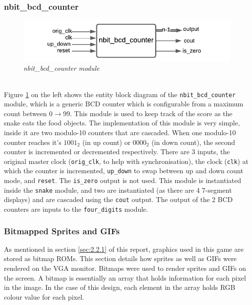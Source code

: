 \documentclass[aps, secnumarabic, balancelastpage, asmath, amssymb, nofootinbib, floatfix,]{revtex4-2}
\begin{document}
{\vspace{-1em}
\subsubsection{\fontsize{10pt}{12pt}\selectfont \bf nbit\_bcd\_counter \label{sec:2.2.8}}

\vspace{-1em}
\begin{figure}
  \centering
  \includegraphics[scale = 0.8]{bcd.pdf}
  \caption{\em nbit\_bcd\_counter module}
  \label{fig:16}
\end{figure}
~\\
Figure \ref{fig:16} on the left shows the entity block diagram of the \verb|nbit_bcd_counter| module, which is a generic BCD counter which is configurable from a maximum count between 0$\rightarrow$99. This module is used to keep track of the score as the snake eats the food objects. The implementation of this module is very simple, inside it are two modulo-10 counters that are cascaded. When one modulo-10 counter reaches it's $1001_2$ (in up count) or $0000_2$ (in down count), the second counter is incremented or decremented respectively. There are 3 inputs, the original master clock (\verb|orig_clk|, to help with synchronisation), the clock (\verb|clk|) at which the counter is incremented, \verb|up_down| to swap between up and down count mode, and \verb|reset|. The \verb|is_zero| output is not used. This module is instantiated inside the \verb|snake| module, and two are instantiated (as there are 4 7-segment displays) and are cascaded using the \verb|cout| output. The output of the 2 BCD counters are inputs to the \verb|four_digits| module.

\clearpage

\subsubsection{\fontsize{10pt}{12pt}\selectfont \bf Bitmapped Sprites and GIFs \label{sec:2.2.9}}

As mentioned in section \ref{sec:2.2.1} of this report, graphics used in this game are stored as bitmap ROMs. This section details how sprites as well as GIFs were rendered on the VGA monitor. Bitmaps were used to render sprites and GIFs on the screen. A bitmap is essentially an array that holds information for each pixel in the image. In the case of this design, each element in the array holds RGB colour value for each pixel. 

}
\end{document}
